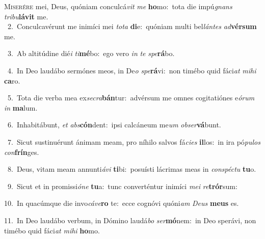 \lettrine{\initial\textcolor{\initialcolor}{M}}{iserére} mei, Deus, quóniam conculcá\textit{vit} \textit{me} \textbf{ho}\-mo:~\star tota die impú\textit{gnans} \textit{tri}\-\textit{bu}\textbf{lá}\textbf{vit} me.\\
{\numbfont\textcolor{\numbcolor}{~2.}}~Conculcavérunt me inimíci mei \textit{to}\-\textit{ta} \textbf{di}\-e:~\star quóniam multi bel\-\textit{lán}\-\textit{tes} \textit{ad}\-\textbf{vér}\textbf{sum} me.\par
{\numbfont\textcolor{\numbcolor}{~3.}}~Ab altitúdine dié\textit{i} \textit{ti}\-\textbf{mé}bo:~\star ego vero \textit{in} \textit{te} \textit{spe}\-\textbf{rá}bo.\par
{\numbfont\textcolor{\numbcolor}{~4.}}~In Deo laudábo sermónes meos, in De\textit{o} \textit{spe}\-\textbf{rá}vi:~\star non timébo quid fáci\textit{at} \textit{mi}\-\textit{hi} \textbf{ca}\-ro.\par
{\numbfont\textcolor{\numbcolor}{~5.}}~Tota die verba mea ex\-\textit{se}\-\textit{cra}\textbf{bán}tur:~\star advérsum me omnes cogitatiónes e\-\textit{ó}\-\textit{rum} \textit{in} \textbf{ma}\-lum.\par
{\numbfont\textcolor{\numbcolor}{~6.}}~Inhabitábunt, \textit{et} \textit{abs}\-\textbf{cón}dent:~\star ipsi calcáneum me\textit{um} \textit{ob}\-\textit{ser}\textbf{vá}bunt.\par
{\numbfont\textcolor{\numbcolor}{~7.}}~Sicut sustinuérunt ánimam meam, pro níhilo salvos fá\-\textit{ci}\-\textit{es} \textbf{il}\-los:~\star in ira pó\-\textit{pu}\-\textit{los} \textit{con}\-\textbf{frín}ges.\par
{\numbfont\textcolor{\numbcolor}{~8.}}~Deus, vitam meam annunti\-\textit{á}\-\textit{vi} \textbf{ti}\-bi:~\star posuísti lácrimas meas in \textit{con}\-\textit{spéc}\textit{tu} \textbf{tu}\-o.\par
{\numbfont\textcolor{\numbcolor}{~9.}}~Sicut et in promissi\-\textit{ó}\-\textit{ne} \textbf{tu}\-a:~\star tunc converténtur inimíci \textit{me}\-\textit{i} \textit{re}\-\textbf{trór}sum:\par
{\numbfont\textcolor{\numbcolor}{10.}}~In quacúmque die invo\-\textit{cá}\-\textit{ve}\textbf{ro} te:~\star ecce cognóvi quóni\textit{am} \textit{De}\-\textit{us} \textbf{me}\-\textbf{us} es.\par
{\numbfont\textcolor{\numbcolor}{11.}}~In Deo laudábo verbum, in Dómino laudá\textit{bo} \textit{ser}\-\textbf{mó}nem:~\star in Deo sperávi, non timébo quid fáci\textit{at} \textit{mi}\-\textit{hi} \textbf{ho}\-mo.\par
